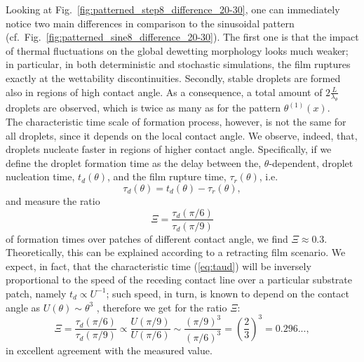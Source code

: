 Looking at Fig.~\ref{fig:patterned_step8_difference_20-30}, one can immediately notice two main differences in comparison to the sinusoidal pattern (cf.~Fig.~\ref{fig:patterned_sine8_difference_20-30}). The first one is that the impact of thermal fluctuations on the global dewetting morphology looks much weaker; in particular, in both deterministic and stochastic simulations, the film ruptures exactly at the wettability discontinuities.
Secondly, stable droplets are formed also in regions of high contact angle. 
As a consequence, a total amount of $2\frac{L}{\lambda_{\theta}}$ droplets are observed, which is twice as many as for the pattern $\theta^{(1)}(x)$.\\
The characteristic time scale of formation process, however, is not the same for all droplets, since it depends on the local contact angle.
We observe, indeed, that, droplets nucleate faster in regions of higher contact angle. 
Specifically, if we define the droplet formation time as the delay between the, $\theta$-dependent, droplet nucleation time, $t_d(\theta)$, and the film rupture time, $\tau_r(\theta)$, i.e.
\begin{equation}\label{eq:taud}
  \tau_d(\theta) = t_d(\theta) - \tau_r(\theta), 
\end{equation}
and measure the ratio
\begin{equation}\label{eq:time_ratio_delta8_substrate}
    \Xi = \frac{\tau_d(\pi/6)}{\tau_d(\pi/9)} 
\end{equation}
of formation times over patches of different contact angle, we find $\Xi \approx 0.3$.
Theoretically, this can be explained according to a retracting film scenario. 
We expect, in fact, that the characteristic time (\ref{eq:taud}) will be inversely proportional to the speed of the receding contact line over a particular substrate patch, namely $t_d \propto U^{-1}$; such speed, in turn, is known to depend on the contact angle as $U(\theta) \sim \theta^3$ \cite{snoeijerAsymptoticAnalysisDewetting2010}, therefore we get for the ratio $\Xi$:
\begin{equation}\label{eq:ratio_U_theta_qubed_1/3}
  \Xi = \frac{\tau_d(\pi/6)}{\tau_d(\pi/9)}  \propto  {\frac{U(\pi/9)}{U(\pi/6)} \sim \frac{\left(\pi/9\right)^3}{\left(\pi/6\right)^3} = \left(\frac{2}{3}\right)^3 = 0.296...},
\end{equation}
in excellent agreement with the measured value.\\
